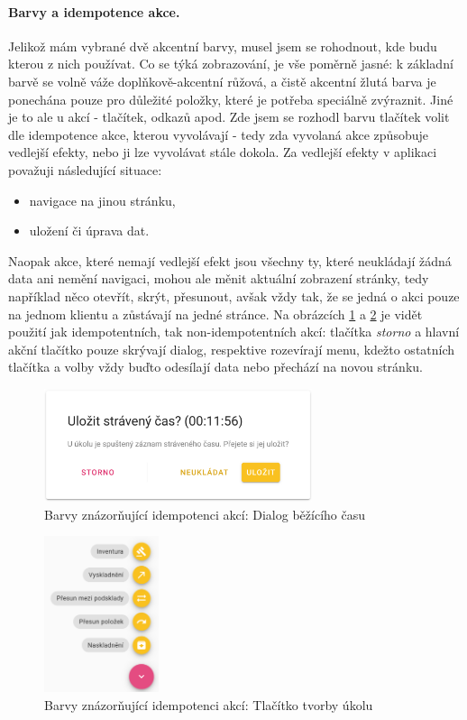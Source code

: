 \paragraph{Barvy a idempotence akce.} Jelikož mám vybrané dvě akcentní barvy, musel jsem se rohodnout, kde budu kterou z nich používat. Co se týká zobrazování, je vše poměrně jasné: k základní barvě se volně váže doplňkově-akcentní růžová, a čistě akcentní žlutá barva je ponechána pouze pro důležité položky, které je potřeba speciálně zvýraznit. Jiné je to ale u akcí - tlačítek, odkazů apod. Zde jsem se rozhodl barvu tlačítek volit dle idempotence akce, kterou vyvolávají - tedy zda vyvolaná akce způsobuje vedlejší efekty, nebo ji lze vyvolávat stále dokola. Za vedlejší efekty v aplikaci považuji následující situace:
\begin{itemize}
    \item navigace na jinou stránku,
    \item uložení či úprava dat.
\end{itemize}
Naopak akce, které nemají vedlejší efekt jsou všechny ty, které neukládají žádná data ani nemění navigaci, mohou ale měnit aktuální zobrazení stránky, tedy například něco otevřít, skrýt, přesunout, avšak vždy tak, že se jedná o akci pouze na jednom klientu a zůstávají na jedné stránce. Na obrázcích \ref{picture:colors:time_tracker} a \ref{picture:colors:task_fab} je vidět použití jak idempotentních, tak non-idempotentních akcí: tlačítka \emph{storno} a hlavní akční tlačítko pouze skrývají dialog, respektive rozevírají menu, kdežto ostatních tlačítka a volby vždy buďto odesílají data nebo přechází na novou stránku.

\begin{figure}[]
    \includegraphics[width=0.7\textwidth]{../png/app/colors_time_tracker.png}
    \caption{Barvy znázorňující idempotenci akcí: Dialog běžícího času} \label{picture:colors:time_tracker}
\end{figure}
\begin{figure}[]
    \includegraphics[width=0.3\textwidth]{../png/app/colors_tasks.png}
    \caption{Barvy znázorňující idempotenci akcí: Tlačítko tvorby úkolu} \label{picture:colors:task_fab}
\end{figure}

